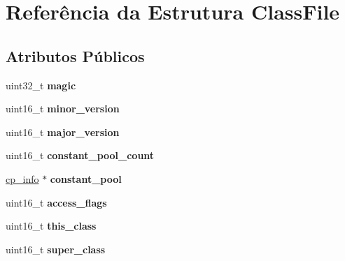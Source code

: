 \hypertarget{structClassFile}{\section{Referência da Estrutura Class\-File}
\label{structClassFile}
}
\subsection*{Atributos Públicos}
\begin{DoxyCompactItemize}
\item 
\hypertarget{structClassFile_a9d4d72751ff9250dd3305d5d853f7921}{uint32\-\_\-t {\bfseries magic}}\label{structClassFile_a9d4d72751ff9250dd3305d5d853f7921}

\item 
\hypertarget{structClassFile_a357116b538d1b1ef11073560eba9396d}{uint16\-\_\-t {\bfseries minor\-\_\-version}}\label{structClassFile_a357116b538d1b1ef11073560eba9396d}

\item 
\hypertarget{structClassFile_a931ebda6a22c18e009891d40016b2790}{uint16\-\_\-t {\bfseries major\-\_\-version}}\label{structClassFile_a931ebda6a22c18e009891d40016b2790}

\item 
\hypertarget{structClassFile_a17e222c05279fafba8da96ef45ff8be2}{uint16\-\_\-t {\bfseries constant\-\_\-pool\-\_\-count}}\label{structClassFile_a17e222c05279fafba8da96ef45ff8be2}

\item 
\hypertarget{structClassFile_a2309d843091aad79aed04ce92470a434}{\hyperlink{structcp__info}{cp\-\_\-info} $\ast$ {\bfseries constant\-\_\-pool}}\label{structClassFile_a2309d843091aad79aed04ce92470a434}

\item 
\hypertarget{structClassFile_a2d095ef980330834af44c587ce52590e}{uint16\-\_\-t {\bfseries access\-\_\-flags}}\label{structClassFile_a2d095ef980330834af44c587ce52590e}

\item 
\hypertarget{structClassFile_aa45abc9545fe11fca252d9769b665294}{uint16\-\_\-t {\bfseries this\-\_\-class}}\label{structClassFile_aa45abc9545fe11fca252d9769b665294}

\item 
\hypertarget{structClassFile_aa48f683b6e5b60021410f88a5e831cbe}{uint16\-\_\-t {\bfseries super\-\_\-class}}\label{structClassFile_aa48f683b6e5b60021410f88a5e831cbe}


\end{DoxyCompactItemize}
